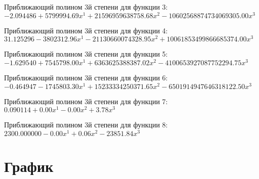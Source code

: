 \documentclass[a4paper,14pt]{extarticle}
\begin{document}
Приближающий полином 3й степени для функции 3: $-2.094486 + 5799994.69x^1 + 21596959638758.68x^2 - 10602568874734069305.00x^3$

Приближающий полином 3й степени для функции 4: $31.125296 - 3802312.96x^1 - 21130660074328.95x^2 + 10061853499866685374.00x^3$

Приближающий полином 3й степени для функции 5: $-1.629540 + 7545798.00x^1 + 6363625388387.02x^2 - 4100653927087752294.75x^3$

Приближающий полином 3й степени для функции 6: $-0.464947 - 1745803.30x^1 + 15233334250371.65x^2 - 6501914947646318122.50x^3$

Приближающий полином 3й степени для функции 7: $0.090114 + 0.00x^1 - 0.00x^2 + 3.78x^3$

Приближающий полином 3й степени для функции 8: $2300.000000 - 0.00x^1 + 0.06x^2 - 23851.84x^3$

\section{График}
\end{document}
